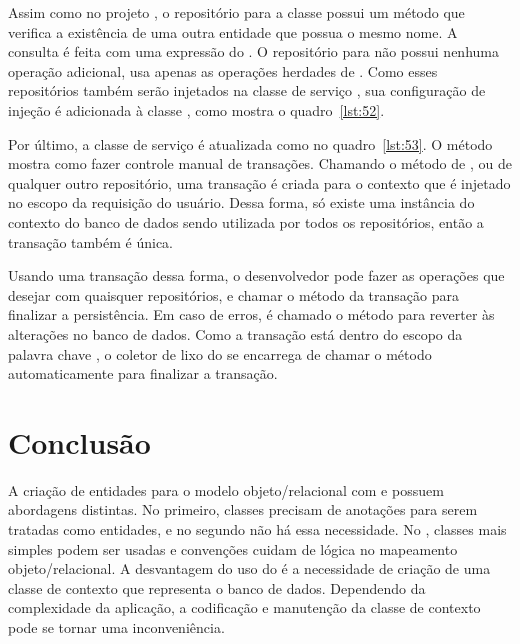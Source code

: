 Assim como no projeto , o repositório para a classe  possui um método que verifica a existência de uma outra entidade que possua o mesmo nome. A consulta é feita com uma expressão  do . O repositório para  não possui nenhuma operação adicional, usa apenas as operações herdades de . Como esses repositórios também serão injetados na classe de serviço , sua configuração de injeção é adicionada à classe , como mostra o quadro~\ref{lst:52}.


Por último, a classe de serviço  é atualizada como no quadro~\ref{lst:53}. O método  mostra como fazer controle manual de transações. Chamando o método  de , ou de qualquer outro repositório, uma transação é criada para o contexto  que é injetado no escopo da requisição do usuário. Dessa forma, só existe uma instância do contexto do banco de dados sendo utilizada por todos os repositórios, então a transação também é única.

Usando uma transação dessa forma, o desenvolvedor pode fazer as operações que desejar com quaisquer repositórios, e chamar o método  da transação para finalizar a persistência. Em caso de erros, é chamado o método  para reverter às alterações no banco de dados. Como a transação está dentro do escopo da palavra chave , o coletor de lixo do  se encarrega de chamar o método  automaticamente para finalizar a transação.


\section{Conclusão}

A criação de entidades para o modelo objeto/relacional com  e  possuem abordagens distintas. No primeiro, classes precisam de anotações para serem tratadas como entidades, e no segundo não há essa necessidade. No , classes mais simples podem ser usadas e convenções cuidam de lógica no mapeamento objeto/relacional. A desvantagem do uso do  é a necessidade de criação de uma classe de contexto que representa o banco de dados. Dependendo da complexidade da aplicação, a codificação e manutenção da classe de contexto pode se tornar uma inconveniência.

